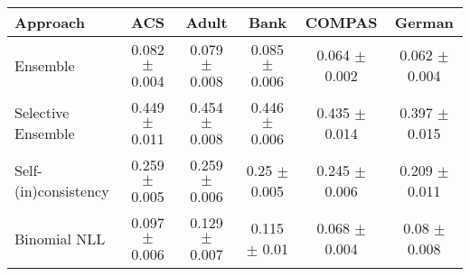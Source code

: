 \begin{tabular} {lccccc}
\toprule
\textbf{Approach} & \textbf{ACS} & \textbf{Adult} & \textbf{Bank} & \textbf{COMPAS} & \textbf{German} \\ \midrule
Ensemble & \cellcolor{gold!30}0.082 $\pm$ 0.004 & \cellcolor{gold!30}0.079 $\pm$ 0.008 & \cellcolor{gold!30}0.085 $\pm$ 0.006 & \cellcolor{gold!30}0.064 $\pm$ 0.002 & \cellcolor{gold!30}0.062 $\pm$ 0.004 \\ 
Selective Ensemble & 0.449 $\pm$ 0.011 & 0.454 $\pm$ 0.008 & 0.446 $\pm$ 0.006 & 0.435 $\pm$ 0.014 & 0.397 $\pm$ 0.015 \\ 
Self-(in)consistency & \cellcolor{bronze!30}0.259 $\pm$ 0.005 & \cellcolor{bronze!30}0.259 $\pm$ 0.006 & \cellcolor{bronze!30}0.25 $\pm$ 0.005 & \cellcolor{bronze!30}0.245 $\pm$ 0.006 & \cellcolor{bronze!30}0.209 $\pm$ 0.011 \\ 
Binomial NLL & \cellcolor{silver!30}0.097 $\pm$ 0.006 & \cellcolor{silver!30}0.129 $\pm$ 0.007 & \cellcolor{silver!30}0.115 $\pm$ 0.01 & \cellcolor{silver!30}0.068 $\pm$ 0.004 & \cellcolor{silver!30}0.08 $\pm$ 0.008 \\ 
\bottomrule
\end{tabular}
